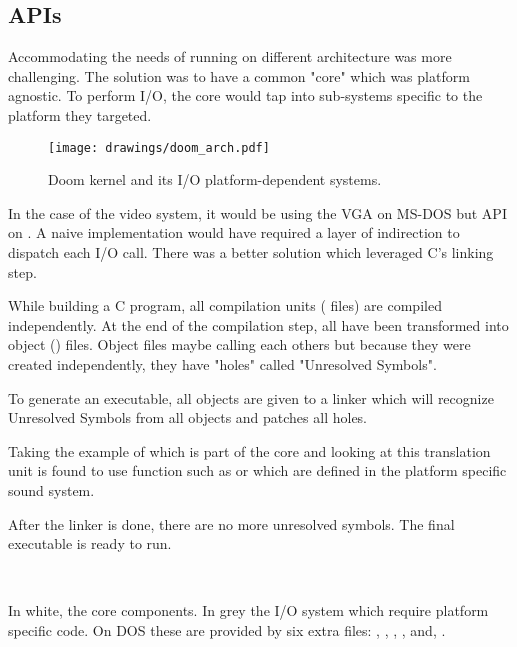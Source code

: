 \subsection{APIs}
Accommodating the needs of running on different architecture was more challenging. The solution was to have a common "core" which was platform agnostic. To perform I/O, the core would tap into sub-systems specific to the platform they targeted.\\
\par
\begin{figure}[H]
\centering
\texttt{[image: drawings/doom\_arch.pdf]}
\caption{Doom kernel and its I/O platform-dependent systems.}
\end{figure}
\par
In the case of the video system, it would be using the VGA on MS-DOS but  API on \NeXT. A naive implementation would have required a layer of indirection to dispatch each I/O call. There was a better solution which leveraged C's linking step.\\
\par
 While building a C program, all compilation units ( files) are compiled independently. At the end of the compilation step, all  have been transformed into object () files. Object files maybe calling each others but because they were created independently, they have "holes" called "Unresolved Symbols".\\
\par
 To generate an executable, all objects are given to a linker which will recognize Unresolved Symbols from all objects and patches all holes.\\
 \par
 Taking the example of  which is part of the core and looking at  this translation unit is found to use function such as  or  which are defined in the platform specific sound system. \\
\par
{}
\par
After the linker is done, there are no more unresolved symbols. The final executable is ready to run.\\
\par
{}\\




\pagebreak
{}
\par
In white, the core components. In grey the I/O system which require platform specific code. On DOS these are provided by six extra files: , , , ,  and, .\\







